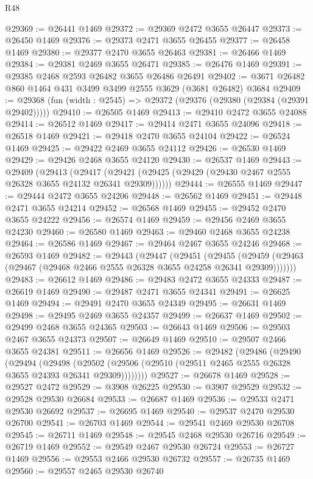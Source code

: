 \begin{lexlean}{R48}
\begin{coremodule}
@29369 := @26441 @1469
@29372 := @29369 @2472 @3655 @26447
@29373 := @26450 @1469
@29376 := @29373 @2471 @3655 @26455
@29377 := @26458 @1469
@29380 := @29377 @2470 @3655 @26463
@29381 := @26466 @1469
@29384 := @29381 @2469 @3655 @26471
@29385 := @26476 @1469
@29391 := @29385 @2468 @2593 @26482 @3655 @26486 @26491
@29402 := @3671 @26482 @860 @1464 @431 @3499 @3499 @2555 @3629 (@3681 @26482) @3684
@29409 := @29368 (fun (width : @2545) => @29372 (@29376 (@29380 (@29384 (@29391 @29402)))))
@29410 := @26505 @1469
@29413 := @29410 @2472 @3655 @24088
@29414 := @26512 @1469
@29417 := @29414 @2471 @3655 @24096
@29418 := @26518 @1469
@29421 := @29418 @2470 @3655 @24104
@29422 := @26524 @1469
@29425 := @29422 @2469 @3655 @24112
@29426 := @26530 @1469
@29429 := @29426 @2468 @3655 @24120
@29430 := @26537 @1469
@29443 := @29409
    (@29413
      (@29417 (@29421 (@29425 (@29429 (@29430 @2467 @2555 @26328 @3655 @24132 @26341 @29309))))))
@29444 := @26555 @1469
@29447 := @29444 @2472 @3655 @24206
@29448 := @26562 @1469
@29451 := @29448 @2471 @3655 @24214
@29452 := @26568 @1469
@29455 := @29452 @2470 @3655 @24222
@29456 := @26574 @1469
@29459 := @29456 @2469 @3655 @24230
@29460 := @26580 @1469
@29463 := @29460 @2468 @3655 @24238
@29464 := @26586 @1469
@29467 := @29464 @2467 @3655 @24246
@29468 := @26593 @1469
@29482 := @29443
    (@29447
      (@29451
        (@29455 (@29459 (@29463 (@29467 (@29468 @2466 @2555 @26328 @3655 @24258 @26341 @29309)))))))
@29483 := @26612 @1469
@29486 := @29483 @2472 @3655 @24333
@29487 := @26619 @1469
@29490 := @29487 @2471 @3655 @24341
@29491 := @26625 @1469
@29494 := @29491 @2470 @3655 @24349
@29495 := @26631 @1469
@29498 := @29495 @2469 @3655 @24357
@29499 := @26637 @1469
@29502 := @29499 @2468 @3655 @24365
@29503 := @26643 @1469
@29506 := @29503 @2467 @3655 @24373
@29507 := @26649 @1469
@29510 := @29507 @2466 @3655 @24381
@29511 := @26656 @1469
@29526 := @29482
    (@29486
      (@29490
        (@29494
          (@29498
            (@29502 (@29506 (@29510 (@29511 @2465 @2555 @26328 @3655 @24393 @26341 @29309))))))))
@29527 := @26678 @1469
@29528 := @29527 @2472
@29529 := @3908 @26225
@29530 := @3907 @29529
@29532 := @29528 @29530 @26684
@29533 := @26687 @1469
@29536 := @29533 @2471 @29530 @26692
@29537 := @26695 @1469
@29540 := @29537 @2470 @29530 @26700
@29541 := @26703 @1469
@29544 := @29541 @2469 @29530 @26708
@29545 := @26711 @1469
@29548 := @29545 @2468 @29530 @26716
@29549 := @26719 @1469
@29552 := @29549 @2467 @29530 @26724
@29553 := @26727 @1469
@29556 := @29553 @2466 @29530 @26732
@29557 := @26735 @1469
@29560 := @29557 @2465 @29530 @26740

\end{coremodule}
\end{lexlean}
